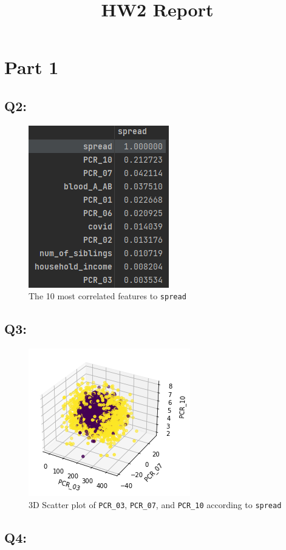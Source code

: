 \documentclass{article}
\title{HW2 Report}
\date{}
\newcommand{\code}[1]{\texttt{#1}}
\begin{document}
\maketitle
\section*{Part 1}
\subsection*{Q2:}
    \begin{figure}[H]
        \centering
        \includegraphics{images/q2.png}
        \caption{The 10 most correlated features to \code{spread}}
    \end{figure}
\subsection*{Q3:}
    \begin{figure}[H]
        \centering
        \includegraphics{images/q3.png}
        \caption{3D Scatter plot of \code{PCR\_03}, \code{PCR\_07}, and \code{PCR\_10} according to \code{spread}}
    \end{figure}
\subsection*{Q4:}
\end{document}
